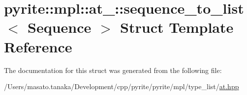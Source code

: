 \hypertarget{structpyrite_1_1mpl_1_1at___1_1sequence__to__list}{}\section{pyrite\+:\+:mpl\+:\+:at\+\_\+\+:\+:sequence\+\_\+to\+\_\+list$<$ Sequence $>$ Struct Template Reference}
\label{structpyrite_1_1mpl_1_1at___1_1sequence__to__list}


The documentation for this struct was generated from the following file\+:\begin{DoxyCompactItemize}
\item 
/\+Users/masato.\+tanaka/\+Development/cpp/pyrite/pyrite/mpl/type\+\_\+list/\mbox{\hyperlink{at_8hpp}{at.\+hpp}}\end{DoxyCompactItemize}
